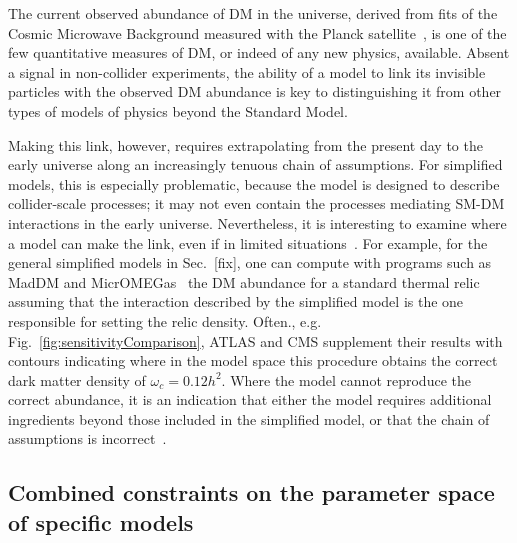 The current observed abundance of DM in the universe, derived from fits of the Cosmic Microwave Background measured with the Planck satellite~\cite{Ade:2015xua}, is one of the few %
quantitative measures of DM, or indeed of any new physics, available.
Absent a signal in non-collider experiments, the ability of a model to link its invisible particles with the observed DM abundance is key to distinguishing it from other types of models of physics beyond the Standard Model.

Making this link, however, requires extrapolating from the present day to the early universe along an increasingly tenuous chain of assumptions. For simplified models, this is especially problematic, because the model is designed to describe collider-scale processes; it may not even contain the processes mediating SM-DM interactions in the early universe. Nevertheless, it is interesting to examine where a model can make the link, even if in limited situations~\cite{Busoni:2014gta,Catena:2017xqq}. For example, for the general simplified models in Sec.~[fix], one can compute with programs such as MadDM and MicrOMEGas~\cite{Backovic:2015cra,Barducci:2016pcb} the DM abundance for a standard thermal relic assuming that the interaction described by the simplified model is the one responsible for setting the relic density. Often., e.g. Fig.~\ref{fig:sensitivityComparison}, ATLAS and CMS supplement their results with contours indicating where in the model space this procedure obtains the correct dark matter density of $\omega_c = 0.12 h^2$. Where the model cannot reproduce the correct abundance, it is an indication that either the model requires additional ingredients beyond those included in the simplified model, or that the chain of assumptions is incorrect~\cite{Bernal:2017kxu}.



\subsection{Combined constraints on the parameter space of specific models}




